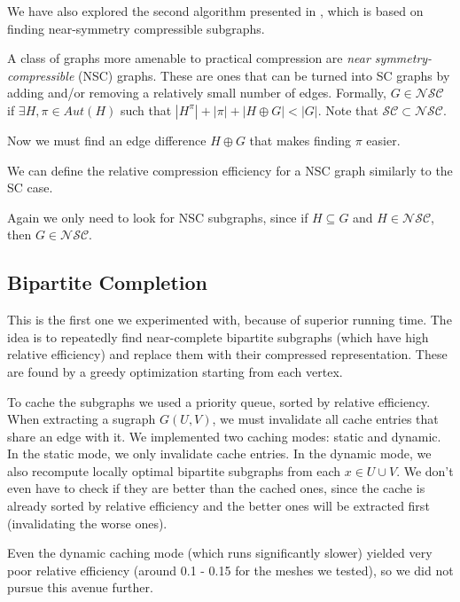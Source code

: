 \documentclass{egpubl}
\begin{document}
We have also explored the second algorithm presented in \cite{cibej2021automorphisms}, which is based on finding near-symmetry compressible subgraphs.

A class of graphs more amenable to practical compression are \textit{near symmetry-compressible} (NSC) graphs. These are ones that can be turned into SC graphs by adding and/or removing a relatively small number of edges.
Formally, $G \in \mathcal{N}\mathcal{S}\mathcal{C}$ if $\exists H, \pi \in Aut(H)$ such that $|H^\pi| + |\pi| + |H \oplus G| < |G|$. Note that $\mathcal{S}\mathcal{C} \subset \mathcal{N}\mathcal{S}\mathcal{C}$.

Now we must find an edge difference $H \oplus G$ that makes finding $\pi$ easier.

We can define the relative compression efficiency for a NSC graph similarly to the SC case.

Again we only need to look for NSC subgraphs, since
if $H \subseteq G$ and $H \in \mathcal{N}\mathcal{S}\mathcal{C}$, then $G \in \mathcal{N}\mathcal{S}\mathcal{C}$.

\subsection{Bipartite Completion} \label{sec:bipartite}

This is the first one we experimented with, because of superior running time.
The idea is to repeatedly find near-complete bipartite subgraphs (which have high relative efficiency) and replace them with their compressed representation. These are found by a greedy optimization starting from each vertex.

To cache the subgraphs we used a priority queue, sorted by relative efficiency. When extracting a sugraph $G(U,V)$, we must invalidate all cache entries that share an edge with it. 
We implemented two caching modes: static and dynamic. In the static mode, we only invalidate cache entries. In the dynamic mode, we also recompute locally optimal bipartite subgraphs from each $x \in U \cup V$. We don't even have to check if they are better than the cached ones, since the cache is already sorted by relative efficiency and the better ones will be extracted first (invalidating the worse ones).

Even the dynamic caching mode (which runs significantly slower) yielded very poor relative efficiency (around 0.1 - 0.15 for the meshes we tested), so we did not pursue this avenue further.
\end{document}
